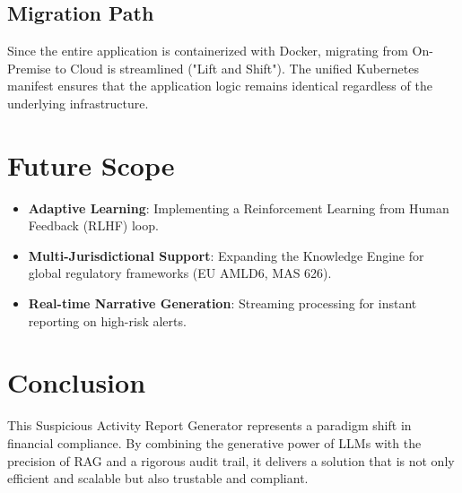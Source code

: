 \documentclass{article}
\begin{document}
\subsection{Migration Path}
Since the entire application is containerized with Docker, migrating from On-Premise to Cloud is streamlined ("Lift and Shift"). The unified Kubernetes manifest ensures that the application logic remains identical regardless of the underlying infrastructure.

\section{Future Scope}
\begin{itemize}
    \item \textbf{Adaptive Learning}: Implementing a Reinforcement Learning from Human Feedback (RLHF) loop.
    \item \textbf{Multi-Jurisdictional Support}: Expanding the Knowledge Engine for global regulatory frameworks (EU AMLD6, MAS 626).
    \item \textbf{Real-time Narrative Generation}: Streaming processing for instant reporting on high-risk alerts.
\end{itemize}

\section{Conclusion}
This Suspicious Activity Report Generator represents a paradigm shift in financial compliance. By combining the generative power of LLMs with the precision of RAG and a rigorous audit trail, it delivers a solution that is not only efficient and scalable but also trustable and compliant.
\end{document}
